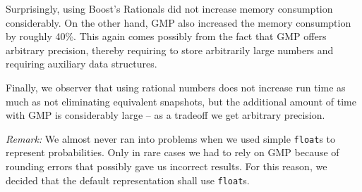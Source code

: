 Surprisingly, using Boost's Rationals did not increase memory consumption considerably. On the other hand, GMP also increased the memory consumption by roughly 40\%. This again comes possibly from the fact that GMP offers arbitrary precision, thereby requiring to store arbitrarily large numbers and requiring auxiliary data structures.

Finally, we observer that using rational numbers does not increase run time as much as not eliminating equivalent snapshots, but the additional amount of time with GMP is considerably large -- as a tradeoff we get arbitrary precision.

\emph{Remark:} We almost never ran into problems when we used simple \texttt{float}s to represent probabilities. Only in rare cases we had to rely on GMP because of rounding errors that possibly gave us incorrect results. For this reason, we decided that the default representation shall use \texttt{float}s.

